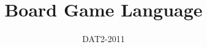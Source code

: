 \documentclass[twoside]{report}
\begin{document}
\title{Board Game Language}
\author{DAT2-2011}
\maketitle

\tableofcontents




\end{document}
